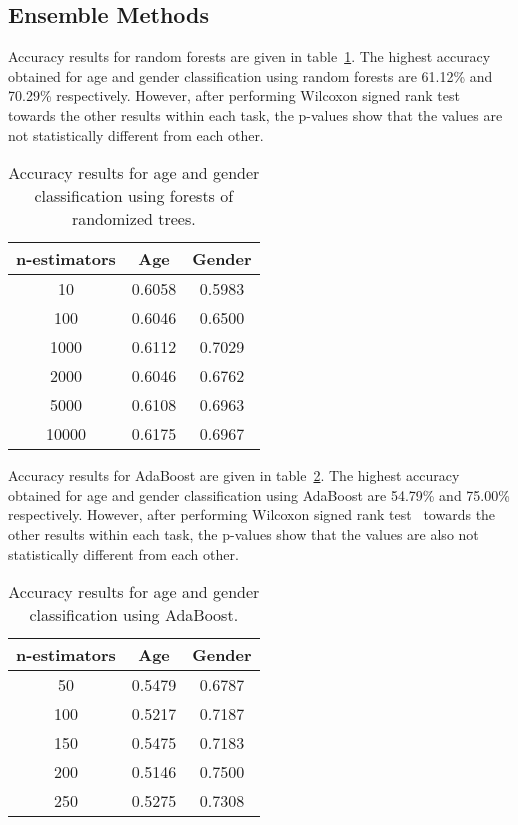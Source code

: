 \documentclass[a4paper]{llncs}
\begin{document}
\subsection{Ensemble Methods}
Accuracy results for random forests are given in table~\ref{table:RandomForests}. The highest accuracy obtained for age and gender classification using random forests are 61.12\% and 70.29\% respectively. However, after performing Wilcoxon signed rank test~\cite{wilcoxon1945individual} towards the other results within each task, the p-values show that the values are not statistically different from each other.  


\begin{table}[!htbp]
\centering
\begin{tabular}{|c|c|c|}
\hline
n-estimators & Age    & Gender \\ \hline
10           & 0.6058 & 0.5983 \\ \hline
100          & 0.6046 & 0.6500 \\ \hline
1000         & 0.6112 & 0.7029 \\ \hline
2000         & 0.6046 & 0.6762 \\ \hline
5000         & 0.6108 & 0.6963 \\ \hline
10000        & 0.6175 & 0.6967 \\ \hline
\end{tabular}
\caption{Accuracy results for age and gender classification using forests of randomized trees.}
\label{table:RandomForests}
\end{table}


Accuracy results for AdaBoost are given in table~\ref{table:AdaBoost}. The highest accuracy obtained for age and gender classification using AdaBoost are 54.79\% and 75.00\% respectively. However, after performing Wilcoxon signed rank test~\cite{wilcoxon1945individual} towards the other results within each task, the p-values show that the values are also not statistically different from each other. 

\begin{table}[!htbp]
\centering
\begin{tabular}{|c|c|c|}
\hline
n-estimators & Age    & Gender \\ \hline
50           & 0.5479 & 0.6787 \\ \hline
100          & 0.5217 & 0.7187 \\ \hline
150          & 0.5475 & 0.7183 \\ \hline
200          & 0.5146 & 0.7500 \\ \hline
250          & 0.5275 & 0.7308 \\ \hline
\end{tabular}
\caption{Accuracy results for age and gender classification using AdaBoost.}
\label{table:AdaBoost}
\end{table}
\end{document}
